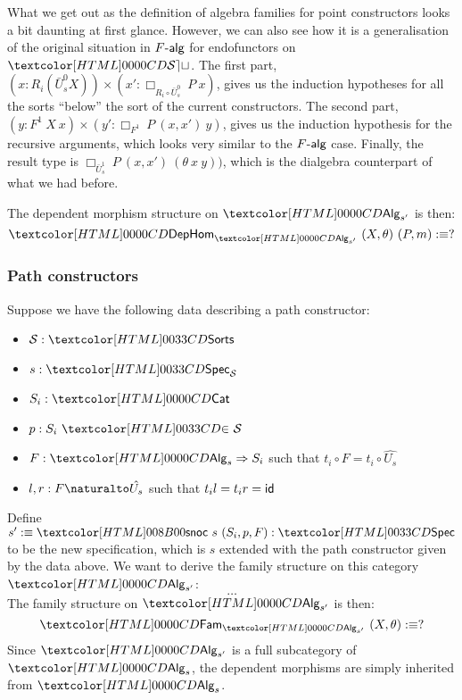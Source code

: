 %
What we get out as the definition of algebra families for point
constructors looks a bit daunting at first glance. However, we can
also see how it is a generalisation of the original situation in
$\algcat{F}$ for endofunctors on $\SET$. The first part,
$(x : R_i (\bar{U}^0_s X)) \times (x' : \Box_{R_i \circ \bar{U}^0_s}\
P\ x)$,
gives us the induction hypotheses for all the sorts ``below'' the sort
of the current constructors. The second part,
$(y : F^1\ X\ x) \times (y' : \Box_{F^1}\ P\ (x, x')\ y)$, gives us
the induction hypothesis for the recursive arguments, which looks very
similar to the $\algcat{F}$ case. Finally, the result type is
$\Box_{\bar{U}^1_s}\ P\ (x,x')\ (\theta\ x\ y))$, which is the
dialgebra counterpart of what we had before.

The dependent morphism structure on $\Alg_{s'}$ is then:
$$  
\DepHom_{\Alg_{s'}}\ (X , \theta)\ (P , m) \ddefeq ?
$$

\subsubsection{Path constructors}

Suppose we have the following data describing a path constructor:
%
\begin{itemize}
\item $\Ss : \sortsty$
\item $s : \specty_{\Ss}$
\item $S_i : \Cat$
\item $p : \sortsin{S_i}{\Ss}$
\item $F : \Func{\Alg_s}{S_i}$ such that $t_i \circ F = t_i \circ \hat{U_s}$
\item $l , r : \Nat{F}{\hat{U_s}}$ such that $t_i l = t_i r = \id$
\end{itemize}

Define $s' \ddefeq \specsnoc\ s\ (S_i,p,F) : \specty$ to be the new
specification, which is $s$ extended with the path constructor given by
the data above. We want to derive the family structure on this
category $\Alg_{s'}$:
$$
\hdots
$$
The family structure on $\Alg_{s'}$ is then:
$$
  \Fam_{\Alg_{s'}}\ (X , \theta) \ddefeq ? \\
$$
Since $\Alg_{s'}$ is a full subcategory of $\Alg_s$, the dependent
morphisms are simply inherited from $\Alg_s$.
